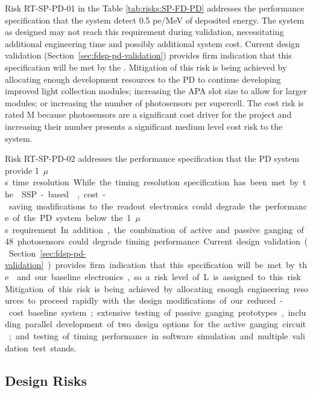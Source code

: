 Risk RT-SP-PD-01 in the Table \ref{tab:risks:SP-FD-PD} addresses the performance specification that the  system detect 0.5 pe/MeV of deposited energy.  The system as designed may not reach this requirement during validation, necessitating additional engineering time and possibly additional system cost.  Current design validation (Section~\ref{sec:fdsp-pd-validation}) 
provides firm indication that this specification will be met by the .  Mitigation of this risk is being achieved by allocating enough development resources to the PD to continue developing improved light collection modules; increasing the APA slot size to allow for larger modules; or increasing the number of photosensors per  supercell.  %
The cost risk is rated M because photosensors are a significant cost driver for the project and increasing their number presents a significant medium level cost risk to the system.

Risk RT-SP-PD-02 addresses the performance specification that the PD system provide \SI{1}{$\mu$s} time resolution.  While the timing resolution specification has been met by the  SSP-based ,  cost-saving modifications to the readout electronics could degrade the performance of the PD system below the \SI{1}{$\mu$s} requirement.  In addition, the combination of active and passive ganging of 48 photosensors could degrade timing performance.  Current design validation (Section~\ref{sec:fdsp-pd-validation}) provides firm indication that this specification will be met by the  and our baseline electronics, so a risk level of L is assigned to this risk.  Mitigation of this risk is being achieved by allocating enough engineering resources to proceed rapidly with the design modifications of our reduced-cost baseline system; extensive testing of passive ganging prototypes, including parallel development of two design options for the active ganging circuit; and testing of timing performance in software simulation and multiple validation test stands.


\subsection{Design Risks}

